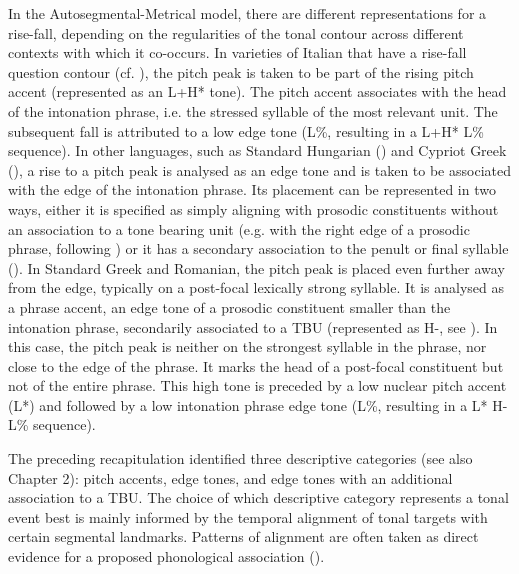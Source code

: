 In the Autosegmental-Metrical model, there are different representations for a rise-fall, depending on the regularities of the tonal contour across different contexts with which it co-occurs. In varieties of Italian  that have a rise-fall question contour (cf. \citealt{Grice.etal2005ita,SavinoGrice2011}), the pitch peak is taken to be part of the rising pitch accent (represented as an L+H* tone). The pitch accent associates with the head of the intonation phrase, i.e. the stressed syllable of the most relevant unit. The subsequent fall is attributed to a low edge tone (L\%, resulting in a L+H* L\% sequence). In other languages, such as Standard Hungarian (\citealt{Ladd1983,Varga2002}) and Cypriot Greek (\citealt{Arvaniti1998}), a rise to a pitch peak is analysed as an edge tone and is taken to be associated with the edge of the intonation phrase. Its placement can be represented in two ways, either it is specified as simply aligning with prosodic constituents without an association to a tone bearing unit (e.g. with the right edge of a prosodic phrase, following \citealt{PierrBeck1988}) or it has a secondary association to the penult or final syllable (\citealt{Grice.etal2000}). In Standard Greek and Romanian, the pitch peak is placed even further away from the edge, typically on a post-focal lexically strong syllable. It is analysed as a phrase accent, an edge tone of a prosodic constituent smaller than the intonation phrase, secondarily associated to a TBU (represented as H-, see \citealt{Grice.etal2000}). In this case, the pitch peak is neither on the strongest syllable in the phrase, nor close to the edge of the phrase. It marks the head of a post-focal constituent but not of the entire phrase. This high tone is preceded by a low nuclear pitch accent (L*) and followed by a low intonation phrase edge tone (L\%, resulting in a L* H- L\% sequence).  

The preceding recapitulation identified three descriptive categories (see also Chapter 2): pitch accents, edge tones, and edge tones with an additional association to a TBU. The choice of which descriptive category represents a tonal event best is mainly informed by the temporal alignment of tonal targets with certain segmental landmarks. Patterns of alignment are often taken as direct evidence for a proposed phonological association (\citealt{Arvaniti.etal2000}). 

